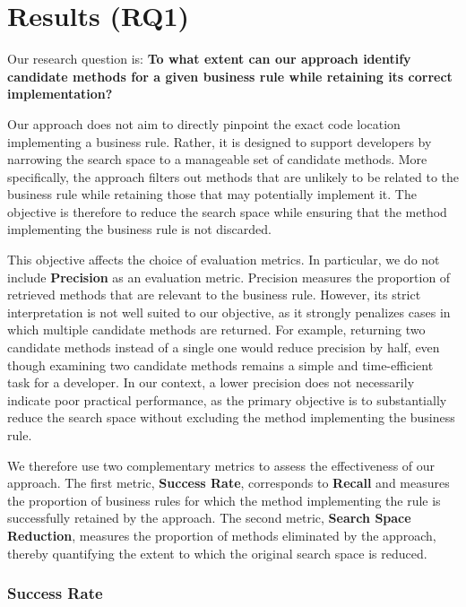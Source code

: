 \section{Results (RQ1)}
\label{sec:resultsRQ1}

Our research question is: \textbf{To what extent can our approach identify candidate methods for a given business rule while retaining its correct implementation?}

Our approach does not aim to directly pinpoint the exact code location implementing a business rule. Rather, it is designed to support developers by narrowing the search space to a manageable set of candidate methods. More specifically, the approach filters out methods that are unlikely to be related to the business rule while retaining those that may potentially implement it. The objective is therefore to reduce the search space while ensuring that the method implementing the business rule is not discarded.

This objective affects the choice of evaluation metrics. In particular, we do not include \textbf{Precision} as an evaluation metric. Precision measures the proportion of retrieved methods that are relevant to the business rule. However, its strict interpretation is not well suited to our objective, as it strongly penalizes cases in which multiple candidate methods are returned. For example, returning two candidate methods instead of a single one would reduce precision by half, even though examining two candidate methods remains a simple and time-efficient task for a developer. In our context, a lower precision does not necessarily indicate poor practical performance, as the primary objective is to substantially reduce the search space without excluding the method implementing the business rule.

We therefore use two complementary metrics to assess the effectiveness of our approach. The first metric, \textbf{Success Rate}, corresponds to \textbf{Recall} and measures the proportion of business rules for which the method implementing the rule is successfully retained by the approach. The second metric, \textbf{Search Space Reduction}, measures the proportion of methods eliminated by the approach, thereby quantifying the extent to which the original search space is reduced.

\vspace{-0.3em}

\subsubsection{Success Rate}\noindent

